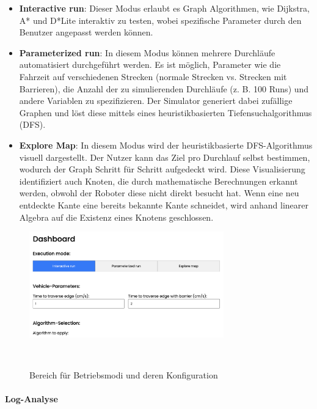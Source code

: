 \documentclass[main.tex]{subfiles} %
\begin{document}
\begin{itemize}
  \item \textbf{Interactive run}:
    Dieser Modus erlaubt es Graph Algorithmen, wie Dijkstra, A* und 
    D*Lite interaktiv zu testen, wobei spezifische Parameter durch 
    den Benutzer angepasst werden können.

  \item \textbf{Parameterized run}:
    In diesem Modus können mehrere Durchläufe automatisiert
    durchgeführt werden. Es ist möglich, Parameter wie die Fahrzeit
    auf verschiedenen Strecken (normale Strecken vs. Strecken mit
    Barrieren), die Anzahl der zu simulierenden Durchläufe (z. B. 100
    Runs) und andere Variablen zu spezifizieren. Der Simulator
    generiert dabei zufällige Graphen und löst diese mittels eines
    heuristikbasierten Tiefensuchalgorithmus (DFS).

  \item \textbf{Explore Map}:
    In diesem Modus wird der heuristikbasierte DFS-Algorithmus
    visuell dargestellt. Der Nutzer kann das Ziel pro Durchlauf
    selbst bestimmen, wodurch der Graph Schritt für Schritt
    aufgedeckt wird. Diese Visualisierung identifiziert auch Knoten,
    die durch mathematische Berechnungen erkannt werden, obwohl der
    Roboter diese nicht direkt besucht hat. Wenn eine neu entdeckte
    Kante eine bereits bekannte Kante schneidet, wird anhand linearer
    Algebra auf die Existenz eines Knotens geschlossen.
\end{itemize}

\begin{figure}[H]
  \centering
  \includegraphics[width=0.75\textwidth]{./fig_Simulation/SimulatorConfig.png}
  \caption{Bereich für Betriebsmodi und deren
  Konfiguration}~\label{fig:DashboardConfig}
\end{figure}

\paragraph{Log-Analyse}
\end{document}
